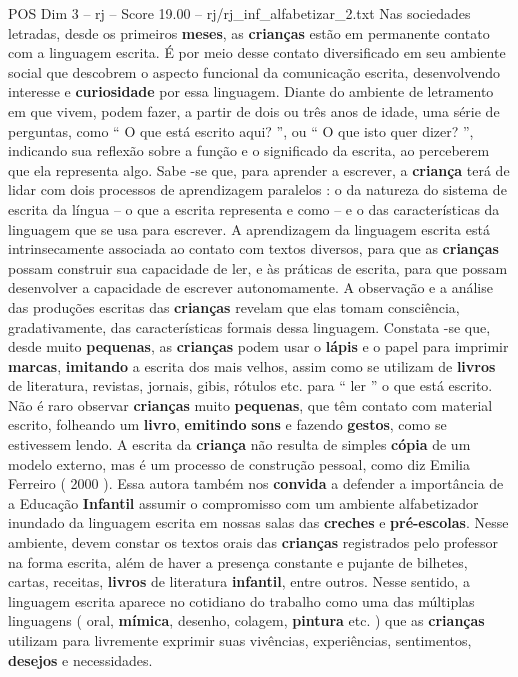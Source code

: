 \begin{textsample}{POS Dim 3 – rj – Score 19.00 – rj/rj\_inf\_alfabetizar\_2.txt}  \label{ex:f3_pos_013}
Nas sociedades letradas, desde os primeiros \textbf{meses}, as \textbf{crianças} estão em permanente contato com a linguagem escrita.
É por meio desse contato diversificado em seu ambiente social que descobrem o aspecto funcional da comunicação escrita, desenvolvendo interesse e \textbf{curiosidade} por essa linguagem.
Diante do ambiente de letramento em que vivem, podem fazer, a partir de dois ou três anos de idade, uma série de perguntas, como “ O que está escrito aqui? ”, ou “ O que isto quer dizer? ”, indicando sua reflexão sobre a função e o significado da escrita, ao perceberem que ela representa algo.
Sabe -se que, para aprender a escrever, a \textbf{criança} terá de lidar com dois processos de aprendizagem paralelos : o da natureza do sistema de escrita da língua – o que a escrita representa e como – e o das características da linguagem que se usa para escrever.
A aprendizagem da linguagem escrita está intrinsecamente associada ao contato com textos diversos, para que as \textbf{crianças} possam construir sua capacidade de ler, e às práticas de escrita, para que possam desenvolver a capacidade de escrever autonomamente.
A observação e a análise das produções escritas das \textbf{crianças} revelam que elas tomam consciência, gradativamente, das características formais dessa linguagem.
Constata -se que, desde muito \textbf{pequenas}, as \textbf{crianças} podem usar o \textbf{lápis} e o papel para imprimir \textbf{marcas}, \textbf{imitando} a escrita dos mais velhos, assim como se utilizam de \textbf{livros} de literatura, revistas, jornais, gibis, rótulos etc. para “ ler ” o que está escrito.
Não é raro observar \textbf{crianças} muito \textbf{pequenas}, que têm contato com material escrito, folheando um \textbf{livro}, \textbf{emitindo} \textbf{sons} e fazendo \textbf{gestos}, como se estivessem lendo.
A escrita da \textbf{criança} não resulta de simples \textbf{cópia} de um modelo externo, mas é um processo de construção pessoal, como diz Emilia Ferreiro ( 2000 ).
Essa autora também nos \textbf{convida} a defender a importância de a Educação \textbf{Infantil} assumir o compromisso com um ambiente alfabetizador inundado da linguagem escrita em nossas salas das \textbf{creches} e \textbf{pré-escolas}.
Nesse ambiente, devem constar os textos orais das \textbf{crianças} registrados pelo professor na forma escrita, além de haver a presença constante e pujante de bilhetes, cartas, receitas, \textbf{livros} de literatura \textbf{infantil}, entre outros.
Nesse sentido, a linguagem escrita aparece no cotidiano do trabalho como uma das múltiplas linguagens ( oral, \textbf{mímica}, desenho, colagem, \textbf{pintura} etc. ) que as \textbf{crianças} utilizam para livremente exprimir suas vivências, experiências, sentimentos, \textbf{desejos} e necessidades.

\end{textsample}
